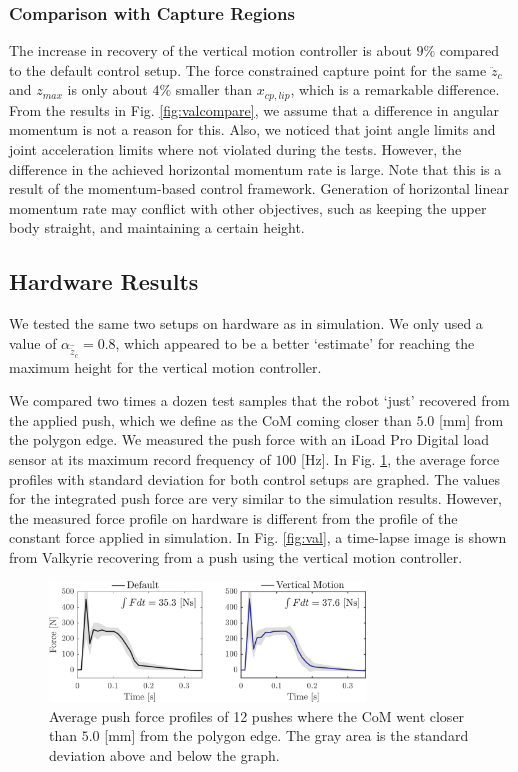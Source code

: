 \documentclass[letterpaper, 10 pt, conference]{ieeeconf}  %
\newcommand{\zmax}{z_{max}}
\begin{document}
\subsubsection{Comparison with Capture Regions}
The increase in recovery of the vertical motion controller is about $9\%$ compared to the default control setup. The force constrained capture point for the same $\ddot{z}_c$ and $\zmax$ is only about $4\%$ smaller than $x_{cp,lip}$, which is a remarkable difference. From the results in Fig. \ref{fig:valcompare}, we assume that a difference in angular momentum is not a reason for this. Also, we noticed that joint angle limits and joint acceleration limits where not violated during the tests.
However, the difference in the achieved horizontal momentum rate is large. Note that this is a result of the momentum-based control framework. Generation of horizontal linear momentum rate may conflict with other objectives, such as keeping the upper body straight, and maintaining a certain height.

\subsection{Hardware Results}
We tested the same two setups on hardware as in simulation. We only used a value of $\alpha_{\hat{\ddot{z}}_{c}}=0.8$, which appeared to be a better `estimate' for reaching the maximum height for the vertical motion controller.

We compared two times a dozen test samples that the robot `just' recovered from the applied push, which we define as the CoM coming closer than $5.0$ [mm] from the polygon edge. We measured the push force with an iLoad Pro Digital load sensor at its maximum record frequency of $100$ [Hz]. In Fig. \ref{fig:impulsecompare}, the average force profiles with standard deviation for both control setups are graphed. The values for the integrated push force are very similar to the simulation results. However, the measured force profile on hardware is different from the profile of the constant force applied in simulation. In Fig. \ref{fig:val}, a time-lapse image is shown from Valkyrie recovering from a push using the vertical motion controller.

\begin{figure}[h]
      \centering
      \includegraphics[width=3.3in]{impulsecompare.png}
      \caption{Average push force profiles of 12 pushes where the CoM went closer than $5.0$ [mm] from the polygon edge. The gray area is the standard deviation above and below the graph. }
      \label{fig:impulsecompare}
\end{figure}
\end{document}

